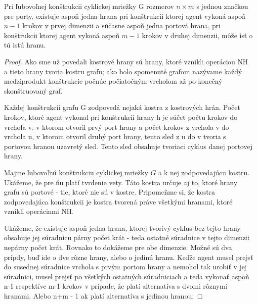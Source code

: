 \begin{veta}
Pri ľubovoľnej konštrukcii cyklickej mriežky G rozmerov $n \times m$ 
s jednou značkou
pre porty, existuje aspoň jedna hrana pri konštrukcii ktorej agent vykoná 
aspoň $n - 1$ krokov v prvej dimenzii
a súčasne aspoň jedna portová hrana,
 pri konštrukcii ktorej agent vykoná aspoň $m - 1$ krokov v druhej dimenzii,
môže ísť o tú istú hranu.
\end{veta}
\begin{proof}
Ako sme už povedali kostrové hrany sú hrany, ktoré vznikli operáciou NH a
tieto hrany tvoria kostru grafu; ako bolo spomenuté grafom nazývame každý
medziprodukt konštrukcie počnúc počiatočným vrcholom až po konečný
skonštruovaný graf.

Každej konštrukcii grafu G zodpovedá nejaká kostra z kostrových hrán. Počet
krokov, ktoré agent vykonal pri konštrukcii hrany h je súčet počtu krokov do
vrchola v, v ktorom otvoril prvý port hrany a počet krokov z vrchola v do
vrchola u, v ktorom otvoril druhý port hrany, 
tento sled z u do v tvoria s portovou
hranou uzavretý sled. Tento sled obsahuje tvoriaci cyklus danej portovej
hrany.

Majme ľubovoľnú konštrukciu cyklickej mriežky $G$ a k nej zodpovedajúcu
kostru. Ukážeme, že pre ňu platí tvrdenie vety.
Táto kostra určuje aj to, ktoré hrany grafu sú portové - tie, ktoré nie sú v
kostre. Pripomeňme si, že kostra zodpovedajúca konštrukcii je kostra tvorená
práve všetkými hranami, ktoré vznikli operáciami NH.

Ukážeme, že existuje aspoň jedna hrana, ktorej tvorivý cyklus bez tejto
hrany obsahuje jej
súradnicu párny počet krát - teda ostatné súradnice v tejto dimenzii nepárny
počet krát. Rovnako to dokážeme pre obe dimenzie. Možné sú dva prípdy, buď
ide o dve rôzne hrany, alebo o jedinú hranu.
Keďže agent musel prejsť do susednej súradnice vrchola s prvým portom hrany
a nemohol tak urobiť v jej súradnici, musel prejsť po všetkých ostatných
súradniciach a teda vykonať aspoň n-1 respektíve m-1 krokov v prípade, že
platí alternatíva s dvomi rôznymi hranami. Alebo n+m - 1 ak platí
alternatíva s jedinou hranou. 



\end{proof}
